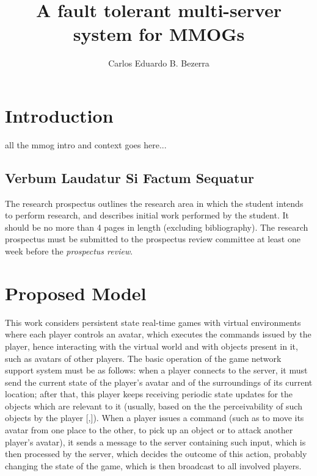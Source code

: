 \documentclass[]{usiinfprospectus}
\author{Carlos Eduardo B. Bezerra}
\title{A fault tolerant multi-server system for MMOGs}
\begin{document}
\maketitle

\section{Introduction} \label{sec_introduction}

all the mmog intro and context goes here...

\subsection{Verbum Laudatur Si Factum Sequatur}

The research prospectus outlines the research area in which the student intends to perform research, and describes initial work performed by the student. It should be no more than 4 pages in length (excluding bibliography). The research prospectus must be submitted to the prospectus review committee at least one week before the {\em prospectus review}.

\section{Proposed Model} \label{sec:model}

This work considers persistent state real-time games with virtual environments where each player controls an avatar, which executes the commands issued by the player, hence interacting with the virtual world and with objects present in it, such as avatars of other players. The basic operation of the game network support system must be as follows: when a player connects to the server, it must send the current state of the player's avatar and of the surroundings of its current location; after that, this player keeps receiving periodic state updates for the objects which are relevant to it (usually, based on the the perceivability of such objects by the player [,]). When a player issues a command (such as to move its avatar from one place to the other, to pick up an object or to attack another player's avatar), it sends a message to the server containing such input, which is then processed by the server, which decides the outcome of this action, probably changing the state of the game, which is then broadcast to all involved players.
\end{document}
